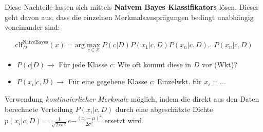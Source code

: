 Diese Nachteile lassen sich mittels \textbf{Naivem Bayes Klassifikators} lösen. Dieser geht davon aus, dass die einzelnen Merkmalsausprägungen bedingt unabhängig voneinander sind:

\begin{equation*}
    \text{clf}_D^{\text{NaiveBayes}}(x)=\text{arg}\max_{c\in Z} P(c\vert D)P(x_1\vert c, D)P(x_n\vert c, D)\dots P(x_n\vert c, D)
\end{equation*}

\begin{itemize}
    \item $P(c\vert D) \rightarrow$ Für jede Klasse $c$: Wie oft kommt diese in $D$ vor (Wkt)?
    \item $P(x_i\vert c, D) \rightarrow$ Für eine gegebene Klasse $c$: Einzelwkt. für $x_i=\dots$ 
\end{itemize}

Verwendung \emph{kontinuierlicher Merkmale} möglich, indem die direkt aus den Daten berechnete Verteilung $P(x_i\vert c,D)$ durch eine abgeschätzte Dichte $p(x_i\vert c,D)=\frac{1}{\sqrt{2\pi\sigma^2}}e{-\frac{(x_i-\mu)^2}{2\sigma^2}}$ ersetzt wird.